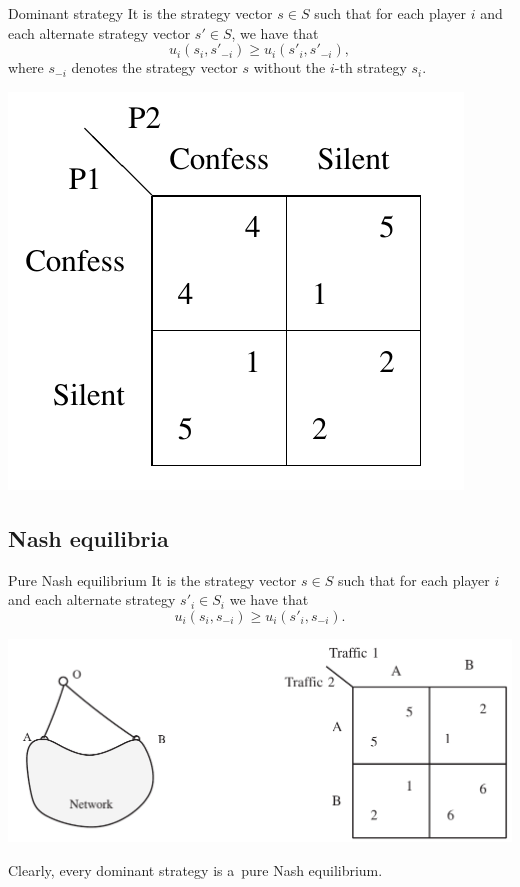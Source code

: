 \documentclass{beamer}
\begin{document}
\begin{frame}{Dominant strategy}
  It is the strategy vector $s\in S$ such that for each player $i$ and each
  alternate strategy vector $s'\in  S$, we have that
  \[u_i(s_i, s'_{-i})\ge  u_i(s'_i, s'_{-i}),\]
  where $s_{-i}$ denotes the strategy vector $s$ without the $i$-th stra\-te\-gy
  $s_i$.

  \begin{center}
    \includegraphics[width=\textwidth,height=0.5\textheight,keepaspectratio]{img/prisoner.png}
  \end{center}
\end{frame}

\subsection{Nash equilibria}

\begin{frame}{Pure Nash equilibrium}
  It is the strategy vector $s\in S$ such that for each player $i$ and each
  alternate strategy $s'_i\in  S_i$ we have that
  \[u_i(s_i, s_{-i})\ge  u_i(s'_i, s_{-i}).\]

  \begin{center}
    \includegraphics[width=\textwidth,height=0.8\textheight,keepaspectratio]{img/routing-congestion-game.png}
  \end{center}

  \pause
  Clearly, every dominant strategy is a~pure Nash equilibrium.

\end{frame}
\end{document}
